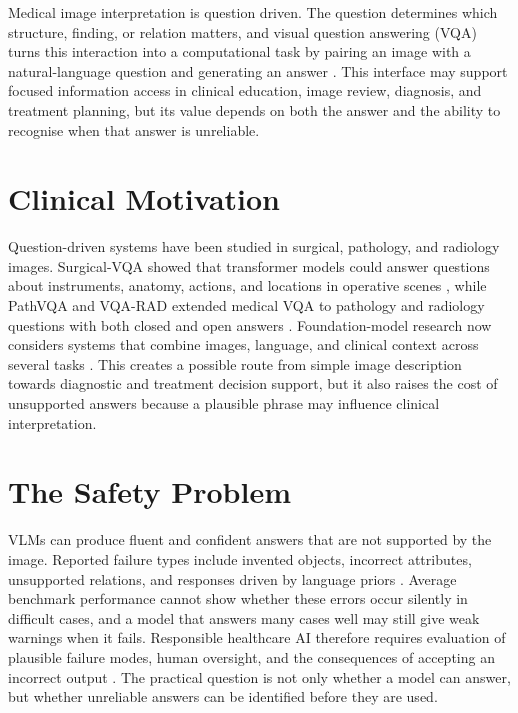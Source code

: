 Medical image interpretation is question driven. The question determines which structure, finding, or relation matters, and visual question answering (VQA) turns this interaction into a computational task by pairing an image with a natural-language question and generating an answer \citep{agrawal2016vqa,he2020pathvqa}. This interface may support focused information access in clinical education, image review, diagnosis, and treatment planning, but its value depends on both the answer and the ability to recognise when that answer is unreliable.

\section{Clinical Motivation}

Question-driven systems have been studied in surgical, pathology, and radiology images. Surgical-VQA showed that transformer models could answer questions about instruments, anatomy, actions, and locations in operative scenes \citep{seenivasan2022surgicalvqa}, while PathVQA and VQA-RAD extended medical VQA to pathology and radiology questions with both closed and open answers \citep{he2020pathvqa,lau2018vqarad}. Foundation-model research now considers systems that combine images, language, and clinical context across several tasks \citep{moor2023foundation}. This creates a possible route from simple image description towards diagnostic and treatment decision support, but it also raises the cost of unsupported answers because a plausible phrase may influence clinical interpretation.

\section{The Safety Problem}

VLMs can produce fluent and confident answers that are not supported by the image. Reported failure types include invented objects, incorrect attributes, unsupported relations, and responses driven by language priors \citep{liu2024hallucinationsurvey}. Average benchmark performance cannot show whether these errors occur silently in difficult cases, and a model that answers many cases well may still give weak warnings when it fails. Responsible healthcare AI therefore requires evaluation of plausible failure modes, human oversight, and the consequences of accepting an incorrect output \citep{wiens2019donoharm}. The practical question is not only whether a model can answer, but whether unreliable answers can be identified before they are used.

